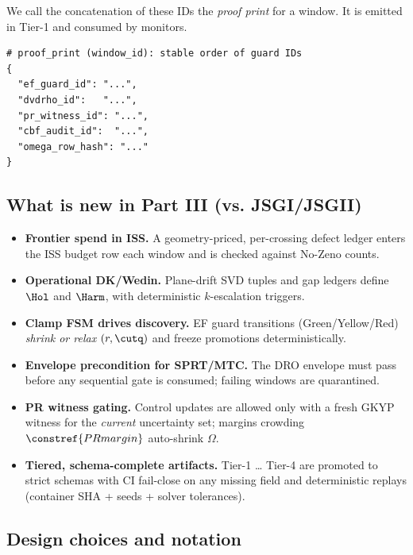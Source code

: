 We call the concatenation of these IDs the \emph{proof print} for a window. It is emitted in Tier-1 and consumed by monitors.

\begin{lstlisting}
# proof_print (window_id): stable order of guard IDs
{
  "ef_guard_id": "...",
  "dvdrho_id":   "...",
  "pr_witness_id": "...",
  "cbf_audit_id":  "...",
  "omega_row_hash": "..."
}
\end{lstlisting}

\subsection{What is new in Part III (vs. JSGI/JSGII)}\label{subsec:intro-contrib}
\emph{}

\begin{itemize}[leftmargin=*]
\item \textbf{Frontier spend in ISS.} A geometry-priced, per-crossing defect ledger enters the ISS budget row each window and is checked against No-Zeno counts. 
\item \textbf{Operational DK/Wedin.} Plane-drift SVD tuples and gap ledgers define $\Hol$ and $\Harm$, with deterministic $k$-escalation triggers. 
\item \textbf{Clamp FSM drives discovery.} EF guard transitions (Green/Yellow/Red) \emph{shrink or relax} $(r,\cutq)$ and freeze promotions deterministically. 
\item \textbf{Envelope precondition for SPRT/MTC.} The DRO envelope must pass before any sequential gate is consumed; failing windows are quarantined. 
\item \textbf{PR witness gating.} Control updates are allowed only with a fresh GKYP witness for the \emph{current} uncertainty set; margins crowding $\constref{PRmargin}$ auto-shrink $\Omega$. 
\item \textbf{Tiered, schema-complete artifacts.} Tier-1 … Tier-4 are promoted to strict schemas with CI fail-close on any missing field and deterministic replays (container SHA + seeds + solver tolerances). 
\end{itemize}

\subsection{Design choices and notation}\label{subsec:intro-notation}
\emph{}

